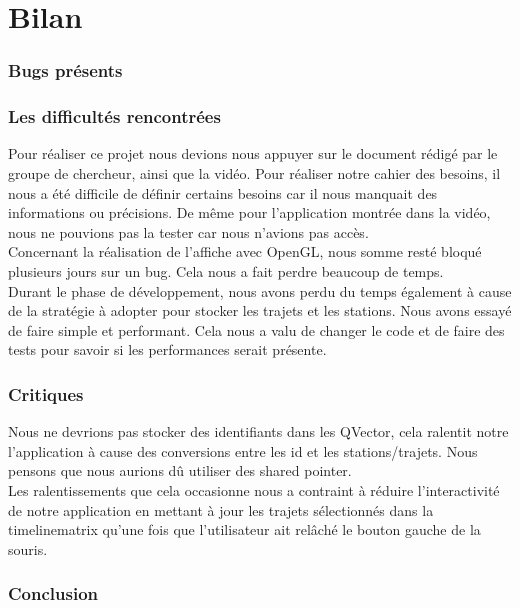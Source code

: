 \documentclass[12pt]{article}
\begin{document}
\part{Bilan}

	\section{Bugs présents}
		
	
	\section{Les difficultés rencontrées}
	Pour réaliser ce projet nous devions nous appuyer sur le document rédigé par le groupe de
	chercheur, ainsi que la vidéo. Pour réaliser notre cahier des besoins, il nous a été
	difficile de définir certains besoins car il nous manquait des informations ou précisions.
	De même pour l’application montrée dans la vidéo, nous ne pouvions pas la tester car nous
	n'avions pas accès.\\

	Concernant la réalisation de l’affiche avec OpenGL, nous somme resté bloqué plusieurs jours
	sur un bug. Cela nous a fait perdre beaucoup de temps.\\

	Durant le phase de développement, nous avons perdu du temps également à cause de la
	stratégie à adopter pour stocker les trajets et les stations. Nous avons essayé de faire
	simple et performant. Cela nous a valu de changer le code et de faire des tests pour savoir
	si les performances serait présente.\\
	
	\section{Critiques}
	Nous ne devrions pas stocker des identifiants dans les QVector, cela ralentit notre
	l’application à cause des conversions entre les id et les stations/trajets. Nous pensons que
	nous aurions dû utiliser des shared pointer.\\
	Les ralentissements que cela occasionne nous a contraint à réduire l’interactivité de
	notre application en mettant à jour les trajets sélectionnés dans la timelinematrix qu’une
	fois que l’utilisateur ait relâché le bouton gauche de la souris. 
	
	\section{Conclusion}
\end{document}
